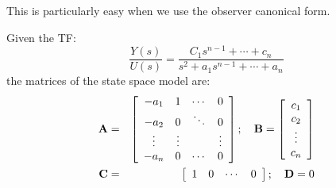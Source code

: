 This is particularly easy when we use the observer canonical form.

Given the TF:
\[
\frac{Y(s)}{U(s)}=\frac{C_1s^{n-1}+\cdots+c_n}{s^2 + a_1s^{n-1}+\cdots+a_n}
\]
the matrices of the state space model are:
\begin{eqnarray*}
	 {\bf{A}} & = & \left[ {\begin{array}{*{20}c}
	   { - a_1 } & 1 &  \cdots  & 0  \\
	   { - a_2 } & 0 &  \ddots  & {0}  \\
	    \vdots  &  \vdots  & {} &  \vdots   \\
	   { - a_n } & 0 &  \cdots  & 0  \\
	\end{array}} \right];\quad {\bf{B}} = \left[ {\begin{array}{*{20}c}
	   {c_1 }  \\
	   {c_2 }  \\
	    \vdots   \\
	   {c_n }  \\
	\end{array}} \right] \\ 
	 {\bf{C}} & = & \left[ {\begin{array}{*{20}c}
	   1 & 0 &  \cdots  & 0  \\
	\end{array}} \right];\quad {\bf{D}} = 0 \\ 	
\end{eqnarray*}


\endinput

